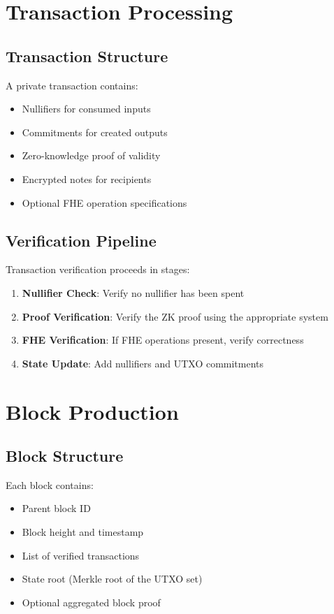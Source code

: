 \documentclass[11pt,a4paper]{article}
\begin{document}
\section{Transaction Processing}

\subsection{Transaction Structure}

A private transaction contains:

\begin{itemize}
    \item Nullifiers for consumed inputs
    \item Commitments for created outputs
    \item Zero-knowledge proof of validity
    \item Encrypted notes for recipients
    \item Optional FHE operation specifications
\end{itemize}

\subsection{Verification Pipeline}

Transaction verification proceeds in stages:

\begin{enumerate}
    \item \textbf{Nullifier Check}: Verify no nullifier has been spent
    \item \textbf{Proof Verification}: Verify the ZK proof using the appropriate system
    \item \textbf{FHE Verification}: If FHE operations present, verify correctness
    \item \textbf{State Update}: Add nullifiers and UTXO commitments
\end{enumerate}

\section{Block Production}

\subsection{Block Structure}

Each block contains:

\begin{itemize}
    \item Parent block ID
    \item Block height and timestamp
    \item List of verified transactions
    \item State root (Merkle root of the UTXO set)
    \item Optional aggregated block proof
\end{itemize}
\end{document}
